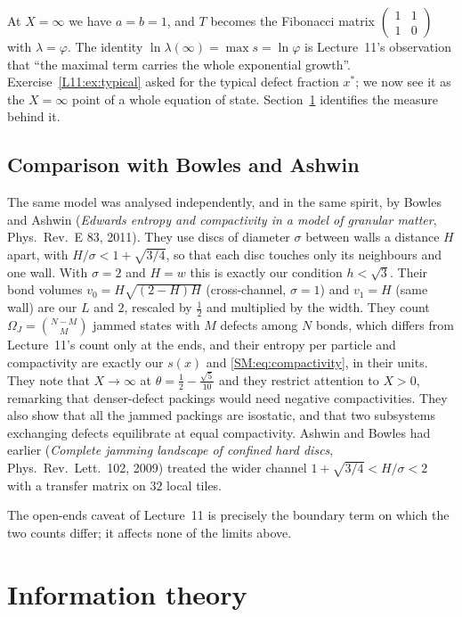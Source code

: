 \documentclass[11pt,openany]{book}
\theoremstyle{plain}
\theoremstyle{definition}
\theoremstyle{remark}
\begin{document}
At $X=\infty$ we have $a=b=1$, and $T$ becomes the Fibonacci matrix $\left(\begin{smallmatrix}1&1\\1&0\end{smallmatrix}\right)$ with
$\lambda=\varphi$. The identity $\ln\lambda(\infty)=\max s=\ln\varphi$ is Lecture~11's observation that ``the
maximal term carries the whole exponential growth''. Exercise~\ref{L11:ex:typical} asked for the
typical defect fraction $x^*$; we now see it as the $X=\infty$ point of a whole equation of state. Section~\ref{SM:sec:info}
identifies the measure behind it.

\subsection{Comparison with Bowles and Ashwin}

The same model was analysed independently, and in the same spirit, by Bowles and Ashwin (\emph{Edwards
entropy and compactivity in a model of granular matter}, Phys.\ Rev.~E 83, 2011). They use discs of
diameter $\sigma$ between walls a distance $H$ apart, with $H/\sigma<1+\sqrt{3/4}$, so that each disc
touches only its neighbours and one wall. With $\sigma=2$ and $H=w$ this is exactly our condition
$h<\sqrt3$. Their bond volumes $v_0=H\sqrt{(2-H)H}$ (cross-channel, $\sigma=1$) and $v_1=H$
(same wall) are our $L$ and $2$, rescaled by $\frac12$ and multiplied by the width. They count
$\Omega_J=\binom{N-M}{M}$ jammed states with $M$ defects among $N$ bonds, which differs from Lecture~11's
count only at the ends, and their entropy per particle and compactivity are exactly our $s(x)$ and
\eqref{SM:eq:compactivity}, in their units. They note that $X\to\infty$ at
$\theta=\frac12-\frac{\sqrt5}{10}$ and they restrict attention to $X>0$, remarking that denser-defect
packings would need negative compactivities. They also show that all the jammed packings are isostatic,
and that two subsystems exchanging defects equilibrate at equal compactivity. Ashwin and Bowles had
earlier (\emph{Complete jamming landscape of confined hard discs}, Phys.\ Rev.\ Lett.\ 102, 2009) treated the wider channel $1+\sqrt{3/4}<H/\sigma<2$ with a transfer
matrix on $32$ local tiles.

The open-ends caveat of Lecture~11 is precisely the boundary term on which the two counts differ; it
affects none of the limits above.

\section{Information theory}
\label{SM:sec:info}
\end{document}
